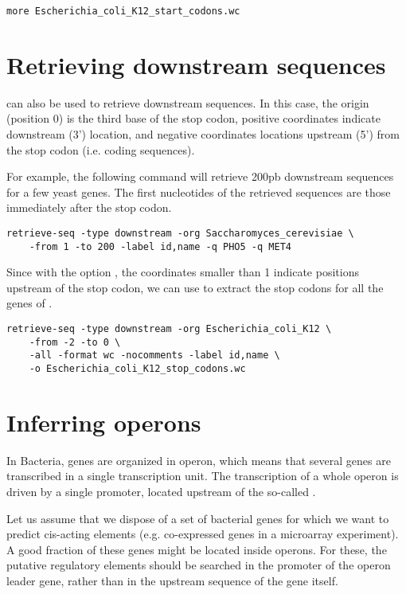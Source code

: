 \begin{lstlisting}
more Escherichia_coli_K12_start_codons.wc
\end{lstlisting}


\section{Retrieving downstream sequences}

 can also be used to retrieve downstream
sequences. In this case, the origin (position 0) is the third base of
the stop codon, positive coordinates indicate downstream (3')
location, and negative coordinates locations upstream (5') from the
stop codon (i.e. coding sequences). 

For example, the following command will retrieve 200pb downstream
sequences for a few yeast genes. The first nucleotides of the
retrieved sequences are those immediately after the stop codon.

\begin{lstlisting}
retrieve-seq -type downstream -org Saccharomyces_cerevisiae \
    -from 1 -to 200 -label id,name -q PHO5 -q MET4
\end{lstlisting}

Since with the option , the coordinates
smaller than 1 indicate positions upstream of the stop codon, we can
use \program{retrieve-seq} to extract the stop codons for all the
genes of \org{Escherichia coli}.

\begin{lstlisting}
retrieve-seq -type downstream -org Escherichia_coli_K12 \
    -from -2 -to 0 \
    -all -format wc -nocomments -label id,name \
    -o Escherichia_coli_K12_stop_codons.wc
\end{lstlisting}

\section{Inferring operons}

In Bacteria, genes are organized in operon, which means that several
genes are transcribed in a single transcription unit. The
transcription of a whole operon is driven by a single promoter,
located upstream of the so-called .

Let us assume that we dispose of a set of bacterial genes for which we
want to predict cis-acting elements (e.g. co-expressed genes in a
microarray experiment). A good fraction of these genes might be
located inside operons. For these, the putative regulatory elements
should be searched in the promoter of the operon leader gene, rather
than in the upstream sequence of the gene itself.

